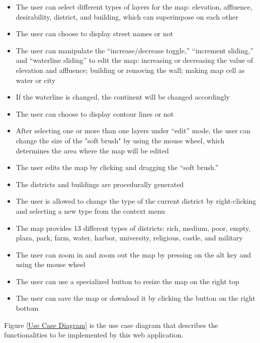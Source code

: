 \begin{itemize}
\begin{itemize}
\begin{itemize}
    	\item The user can select different types of layers for the map: elevation, affluence, desirability, district, and building, which can superimpose on each other
      \item The user can choose to display street names or not
      \item The user can manipulate the ``increase/decrease toggle,'' ``increment sliding,'' and ``waterline sliding'' to edit the map: increasing or decreasing the value of elevation and affluence; building or removing the wall; making map cell as water or city
      \item If the waterline is changed, the continent will be changed accordingly
      \item The user can choose to display contour lines or not
      \item After selecting one or more than one layers under ``edit'' mode, the user can change the size of the "soft brush" by using the mouse wheel, which determines the area where the map will be edited
      \item The user edits the map by clicking and dragging the ``soft brush.''
      \item The districts and buildings are procedurally generated
      \item The user is allowed to change the type of the current district by right-clicking and selecting a new type from the context menu
      \item The map provides 13 different types of districts: rich, medium, poor, empty, plaza, park, farm, water, harbor, university, religious, castle, and military
      \item The user can zoom in and zoom out the map by pressing on the alt key and using the mouse wheel
      \item The user can use a specialized button to resize the map on the right top
      \item The user can save the map or download it by clicking the button on the right bottom
    \end{itemize}
  \end{itemize}
\end{itemize}

Figure \ref{Use Case Diagram} is the use case diagram that describes the functionalities to be implemented by this web application.

